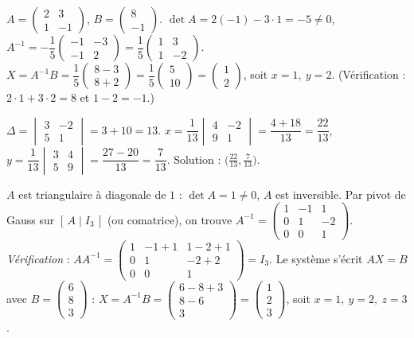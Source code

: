 $A=\begin{pmatrix}2&3\\1&-1\end{pmatrix}$, $B=\begin{pmatrix}8\\-1\end{pmatrix}$.
$\det A=2(-1)-3\cdot1=-5\neq0$, $A^{-1}=-\dfrac15\begin{pmatrix}-1&-3\\-1&2\end{pmatrix}
=\dfrac15\begin{pmatrix}1&3\\1&-2\end{pmatrix}$.
$X=A^{-1}B=\dfrac15\begin{pmatrix}8-3\\8+2\end{pmatrix}=\dfrac15\begin{pmatrix}5\\10\end{pmatrix}
=\begin{pmatrix}1\\2\end{pmatrix}$, soit $x=1,\ y=2$.
(Vérification : $2\cdot1+3\cdot2=8$ et $1-2=-1$.)

$\Delta=\begin{vmatrix}3&-2\\5&1\end{vmatrix}=3+10=13$.
$x=\dfrac1{13}\begin{vmatrix}4&-2\\9&1\end{vmatrix}=\dfrac{4+18}{13}=\dfrac{22}{13}$,
$y=\dfrac1{13}\begin{vmatrix}3&4\\5&9\end{vmatrix}=\dfrac{27-20}{13}=\dfrac{7}{13}$.
Solution : $\big(\tfrac{22}{13},\tfrac{7}{13}\big)$.

$A$ est triangulaire à diagonale de $1$ : $\det A=1\neq0$, $A$ est inversible. Par pivot de Gauss
sur $[\,A\mid I_3\,]$ (ou comatrice), on trouve
$A^{-1}=\begin{pmatrix}1&-1&1\\0&1&-2\\0&0&1\end{pmatrix}$.
\emph{Vérification} : $A A^{-1}=\begin{pmatrix}1&-1+1&1-2+1\\0&1&-2+2\\0&0&1\end{pmatrix}=I_3$.\;
Le système s'écrit $AX=B$ avec $B=\begin{pmatrix}6\\8\\3\end{pmatrix}$ :
$X=A^{-1}B=\begin{pmatrix}6-8+3\\8-6\\3\end{pmatrix}=\begin{pmatrix}1\\2\\3\end{pmatrix}$,
soit $x=1,\ y=2,\ z=3$.

